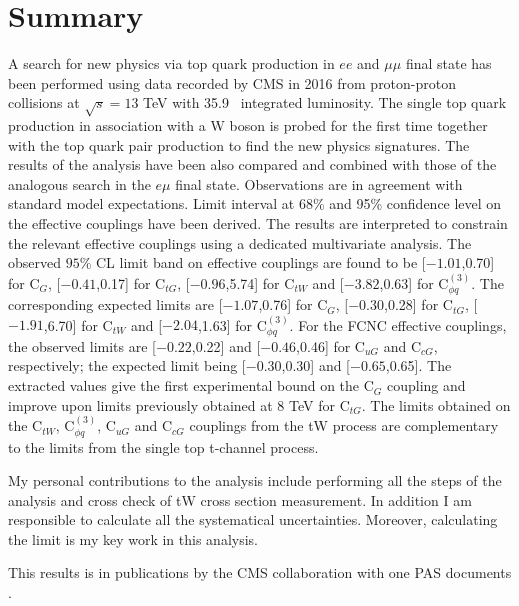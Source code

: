 \clearpage
\section{Summary}
\label{sec:tW_summary} 

A search for new physics via top quark production in $ee$ and $\mu\mu$ final state has been performed using data recorded by CMS in 2016 from proton-proton collisions at $\sqrt{s} = 13$ TeV with 35.9 \fbinv\ integrated luminosity. The single top quark production in association with a W boson is probed for the first time together with the top quark pair production to find the new physics signatures. The results of the analysis have been also compared and combined with those of the analogous search in the $e\mu$ final state.
Observations are in agreement with standard model expectations. Limit interval at 68\% and 95\% confidence level on the effective couplings have been derived.
The results are interpreted to constrain the relevant effective couplings using a dedicated multivariate analysis. The observed $95\%$ CL limit band on  effective couplings are found to be [$-1.01$,0.70] for C$_{G}$, [$-0.41$,0.17]  for C$_{tG}$, [$-0.96$,5.74]  for C$_{tW}$ and [$-3.82$,0.63] for C$_{\phi q}^{(3)}$. The corresponding expected limits are [$-1.07$,0.76] for C$_{G}$, [$-0.30$,0.28] for C$_{tG}$, [$-1.91$,6.70] for C$_{tW}$ and [$-2.04$,1.63] for C$_{\phi q}^{(3)}$. For the FCNC effective couplings, the observed limits are [$-0.22$,0.22] and [$-0.46$,0.46] for C$_{uG}$ and C$_{cG}$, respectively; the expected limit being [$-0.30$,0.30] and [$-0.65$,0.65]. The extracted values give the first experimental bound on the C$_{G}$ coupling and  improve upon limits previously obtained at 8 TeV for C$_{tG}$. The limits obtained on the C$_{tW}$, C$_{\phi q}^{(3)}$, C$_{uG}$ and C$_{cG}$ couplings from the tW process are complementary to the limits from the single top t-channel process.


My personal contributions to the analysis include performing all the steps of the analysis and cross check of tW cross section measurement. In addition I am responsible to calculate
all the systematical uncertainties. Moreover, calculating the limit is my key work in this analysis.

This results is in publications by the CMS collaboration with one PAS documents \cite{CMS-PAS-TOP-17-020}.

